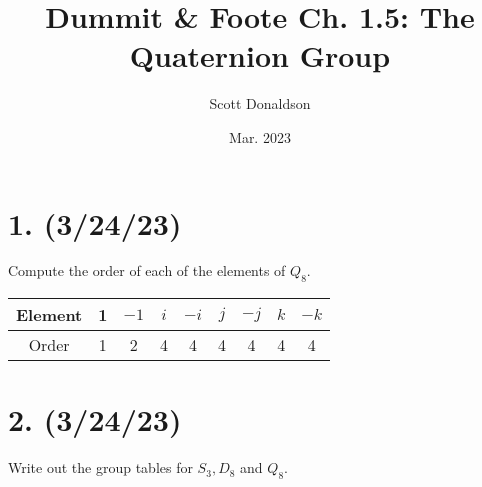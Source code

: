 \documentclass{article}
\title{Dummit \& Foote Ch. 1.5: The Quaternion Group}
\author{Scott Donaldson}
\date{Mar. 2023}
\begin{document}
\maketitle

\section*{1. (3/24/23)}

Compute the order of each of the elements of $Q_8$.

\begin{center}
    \begin{tabular}{ |c|c|c|c|c|c|c|c|c| } 
        \hline
        Element & 1 & $-1$ & $i$ & $-i$ & $j$ & $-j$ & $k$ & $-k$ \\
        \hline
        Order & 1 & 2 & 4 & 4 & 4 & 4 & 4 & 4 \\
        \hline
    \end{tabular}
\end{center}

\section*{2. (3/24/23)}

Write out the group tables for $S_3, D_8$ and $Q_8$.
\end{document}
